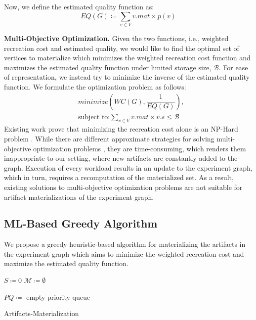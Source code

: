 Now, we define the estimated quality function as:
\[
EQ(G) \coloneqq  \sum\limits_{v \in V}  v.mat \times p(v)
\]

\textbf{Multi-Objective Optimization.}
Given the two functions, i.e., weighted recreation cost and estimated quality, we would like to find the optimal set of vertices to materialize which minimizes the weighted recreation cost function and maximizes the estimated quality function under limited storage size, $\mathcal{B}$.
For ease of representation, we instead try to minimize the inverse of the estimated quality function.
We formulate the optimization problem as follows:
\begin{equation}
\begin{split}
& minimize(WC(G), \dfrac{1}{EQ(G)}), \\
& \text{subject to:} \sum\limits_{v \in V} v.mat \times v.s \leq \mathcal{B}
\end{split}
\end{equation}
Existing work prove that minimizing the recreation cost alone is an NP-Hard problem \cite{bhattacherjee2015principles}.
While there are different approximate strategies for solving multi-objective optimization problems \cite{coello2007evolutionary}, they are time-consuming, which renders them inappropriate to our setting, where new artifacts are constantly added to the graph.
Execution of every workload results in an update to the experiment graph, which in turn, requires a recomputation of the materialized set.
As a result, existing solutions to multi-objective optimization problems are not suitable for artifact materializations of the experiment graph.

\subsection{ML-Based Greedy Algorithm}\label{subsec-ml-based-materialization}
We propose a greedy heuristic-based algorithm for materializing the artifacts in the experiment graph which aims to minimize the weighted recreation cost and maximize the estimated quality function.

\begin{algorithm}[h]
$S \coloneqq 0$
$\mathcal{M} \coloneqq \emptyset$

$PQ \coloneqq $ empty priority queue\;

\caption{Artifacts-Materialization}\label{algorithm-materialization}
\end{algorithm}

